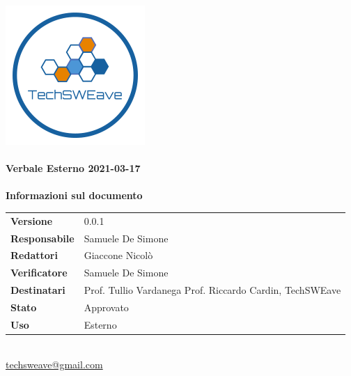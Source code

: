 \documentclass[a4paper]{article}
\begin{document}
\begin{titlepage}
    \begin{center}
        \includegraphics{../../../Images/logo.png}\\
        \vspace{20px}
        \textcolor{logo}{\hrulefill}\\
        \vspace{20px}
        \textbf{\huge\textcolor{logo}{Verbale Esterno 2021-03-17}}\\
        \vspace{10px}
        \textcolor{logo}{\hrulefill}\\
        \vspace{40px}
        \textbf{\Large Informazioni sul documento}\\
        \vspace{20px}
        \begin{tabular}{p{100px} | p{100px}}
            \textbf{Versione} & 0.0.1\\
            \textbf{Responsabile} & Samuele De Simone\\
            \textbf{Redattori} & Giaccone Nicolò\\
            \textbf{Verificatore} & Samuele De Simone\\
            \textbf{Destinatari} & Prof. Tullio Vardanega \newline Prof. Riccardo Cardin, \newline TechSWEave\\
            \textbf{Stato} & Approvato\\
            \textbf{Uso} & Esterno\\
        \end{tabular}\\
        \vspace{60px}
        \href{mailto:techsweave@gmail.com}{techsweave@gmail.com}\\

    \end{center}
    \end{titlepage}
\end{document}
